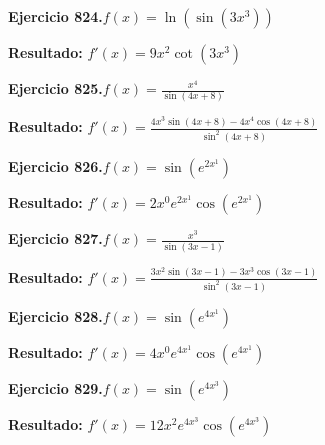 \documentclass[10pt,a4paper]{article}
\begin{document}
\begin{ejbox}
\textbf{Ejercicio 824.}\quad $f(x) = \ln(\sin(3x^{3}))$
\end{ejbox}

\begin{solbox}
\textbf{Resultado:} \(\displaystyle f'(x) = 9x^{2}\cot(3x^{3})\)
\end{solbox}

\begin{ejbox}
\textbf{Ejercicio 825.}\quad $f(x) = \frac{x^{4}}{\sin(4x +8)}$
\end{ejbox}

\begin{solbox}
\textbf{Resultado:} \(\displaystyle f'(x) = \frac{4x^{3}\sin(4x +8) - 4x^{4}\cos(4x +8)}{\sin^2(4x +8)}\)
\end{solbox}

\newpage
\begin{ejbox}
\textbf{Ejercicio 826.}\quad $f(x) = \sin(e^{2x^{1}})$
\end{ejbox}

\begin{solbox}
\textbf{Resultado:} \(\displaystyle f'(x) = 2x^{0}e^{2x^{1}}\cos(e^{2x^{1}})\)
\end{solbox}

\begin{ejbox}
\textbf{Ejercicio 827.}\quad $f(x) = \frac{x^{3}}{\sin(3x -1)}$
\end{ejbox}

\begin{solbox}
\textbf{Resultado:} \(\displaystyle f'(x) = \frac{3x^{2}\sin(3x -1) - 3x^{3}\cos(3x -1)}{\sin^2(3x -1)}\)
\end{solbox}

\begin{ejbox}
\textbf{Ejercicio 828.}\quad $f(x) = \sin(e^{4x^{1}})$
\end{ejbox}

\begin{solbox}
\textbf{Resultado:} \(\displaystyle f'(x) = 4x^{0}e^{4x^{1}}\cos(e^{4x^{1}})\)
\end{solbox}

\newpage
\begin{ejbox}
\textbf{Ejercicio 829.}\quad $f(x) = \sin(e^{4x^{3}})$
\end{ejbox}

\begin{solbox}
\textbf{Resultado:} \(\displaystyle f'(x) = 12x^{2}e^{4x^{3}}\cos(e^{4x^{3}})\)
\end{solbox}
\end{document}
